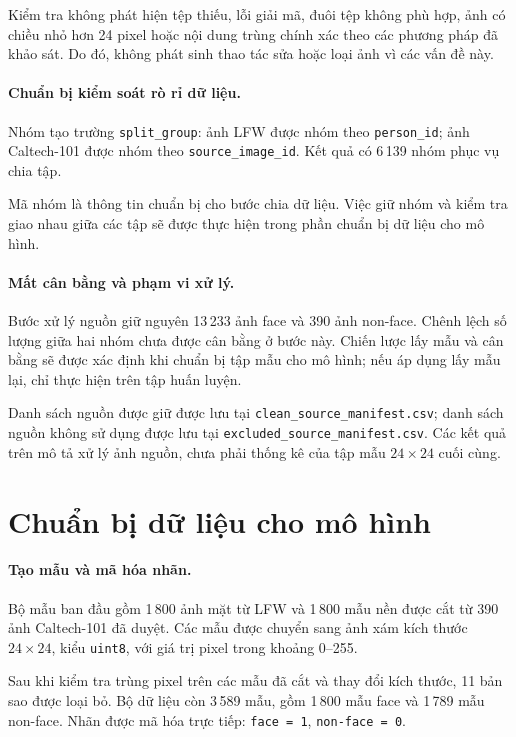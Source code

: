 \documentclass[12pt,a4paper,oneside]{report}
\begin{document}
Kiểm tra không phát hiện tệp thiếu, lỗi giải mã,
đuôi tệp không phù hợp, ảnh có chiều nhỏ hơn
24 pixel hoặc nội dung trùng chính xác
theo các phương pháp đã khảo sát.
Do đó, không phát sinh thao tác sửa hoặc loại ảnh
vì các vấn đề này.

\paragraph{Chuẩn bị kiểm soát rò rỉ dữ liệu.}

Nhóm tạo trường \texttt{split\_group}:
ảnh LFW được nhóm theo \texttt{person\_id};
ảnh Caltech-101 được nhóm theo
\texttt{source\_image\_id}.
Kết quả có 6\,139 nhóm phục vụ chia tập.

Mã nhóm là thông tin chuẩn bị cho bước chia dữ liệu.
Việc giữ nhóm và kiểm tra giao nhau giữa các tập
sẽ được thực hiện trong phần chuẩn bị dữ liệu
cho mô hình.

\paragraph{Mất cân bằng và phạm vi xử lý.}

Bước xử lý nguồn giữ nguyên 13\,233 ảnh face
và 390 ảnh non-face.
Chênh lệch số lượng giữa hai nhóm chưa được
cân bằng ở bước này.
Chiến lược lấy mẫu và cân bằng sẽ được xác định
khi chuẩn bị tập mẫu cho mô hình;
nếu áp dụng lấy mẫu lại, chỉ thực hiện
trên tập huấn luyện.

Danh sách nguồn được giữ được lưu tại
\texttt{clean\_source\_manifest.csv};
danh sách nguồn không sử dụng được lưu tại
\texttt{excluded\_source\_manifest.csv}.
Các kết quả trên mô tả xử lý ảnh nguồn,
chưa phải thống kê của tập mẫu
$24 \times 24$ cuối cùng.
\section{Chuẩn bị dữ liệu cho mô hình}

\paragraph{Tạo mẫu và mã hóa nhãn.}

Bộ mẫu ban đầu gồm 1\,800 ảnh mặt từ LFW
và 1\,800 mẫu nền được cắt từ 390 ảnh Caltech-101
đã duyệt.
Các mẫu được chuyển sang ảnh xám kích thước
$24 \times 24$, kiểu \texttt{uint8},
với giá trị pixel trong khoảng 0--255.

Sau khi kiểm tra trùng pixel trên các mẫu đã
cắt và thay đổi kích thước, 11 bản sao được loại bỏ.
Bộ dữ liệu còn 3\,589 mẫu, gồm 1\,800 mẫu face
và 1\,789 mẫu non-face.
Nhãn được mã hóa trực tiếp:
\texttt{face = 1}, \texttt{non-face = 0}.
\end{document}
